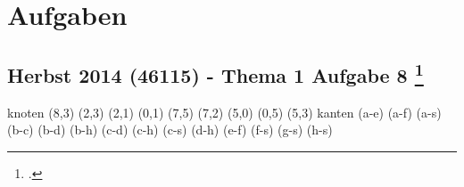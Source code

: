 \documentclass{lehramt-informatik}
\begin{document}


\chapter{Aufgaben}

\section{Herbst 2014 (46115) - Thema 1 Aufgabe 8
\footcite[Seite 2, Aufgabe 3: Tiefensuche, Breitensuche]{aud:ab:6}}

\graph knoten {
  (8,3)
  (2,3)
  (2,1)
  (0,1)
  (7,5)
  (7,2)
  (5,0)
  (0,5)
  (5,3)
} kanten {
  \kanteO(a-e)
  \kanteO(a-f)
  \kanteO(a-s)
  \kanteO(b-c)
  \kanteO(b-d)
  \kanteO(b-h)
  \kanteO(c-d)
  \kanteO(c-h)
  \kanteO(c-s)
  \kanteO(d-h)
  \kanteO(e-f)
  \kanteO(f-s)
  \kanteO(g-s)
  \kanteO(h-s)
}
\end{document}
